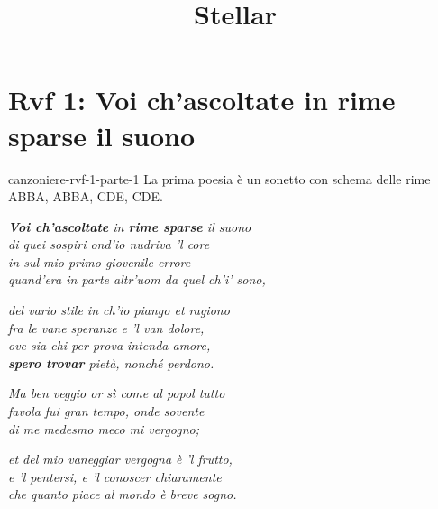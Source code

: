 \documentclass[preview]{standalone}
\begin{document}
\title{Stellar}
\genpage

\section{Rvf 1: Voi ch'ascoltate in rime sparse il suono}

\begin{snippet}{canzoniere-rvf-1-parte-1}
    La prima poesia è un sonetto con schema delle rime ABBA, ABBA, CDE, CDE.

    \begin{center}
        \textit{\textbf{Voi ch'ascoltate} in \textbf{rime sparse} il suono} \\
        \textit{di quei sospiri ond'io nudriva 'l core} \\
        \textit{in sul mio primo giovenile errore} \\
        \textit{quand'era in parte altr'uom da quel ch'i' sono,}
    \end{center}
    \begin{center}
        \textit{del vario stile in ch'io piango et ragiono} \\
        \textit{fra le vane speranze e 'l van dolore,} \\
        \textit{ove sia chi per prova intenda amore,} \\
        \textit{\textbf{spero trovar} pietà, nonché perdono.}
    \end{center}
    \begin{center}
        \textit{Ma ben veggio or sì come al popol tutto} \\
        \textit{favola fui gran tempo, onde sovente} \\
        \textit{di me medesmo meco mi vergogno;}
    \end{center}
    \begin{center}
        \textit{et del mio vaneggiar vergogna è 'l frutto,} \\
        \textit{e 'l pentersi, e 'l conoscer chiaramente} \\
        \textit{che quanto piace al mondo è breve sogno.}
    \end{center}


\end{snippet}
\end{document}
